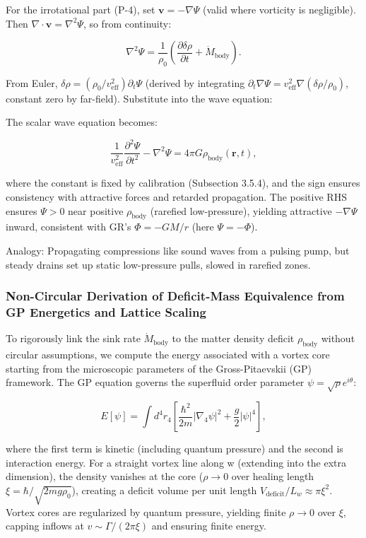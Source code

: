 \documentclass{article}
\begin{document}
For the irrotational part (P-4), set $\mathbf{v} = -\nabla \Psi$ (valid where vorticity is negligible). Then $\nabla \cdot \mathbf{v} = \nabla^2 \Psi$, so from continuity:

\[
\nabla^2 \Psi = \frac{1}{\rho_0} \left( \frac{\partial \delta \rho}{\partial t} + \dot{M}_{\text{body}} \right).
\]

From Euler, $\delta \rho = (\rho_0 / v_{\text{eff}}^2) \partial_t \Psi$ (derived by integrating $\partial_t \nabla \Psi = v_{\text{eff}}^2 \nabla (\delta \rho / \rho_0)$, constant zero by far-field). Substitute into the wave equation:

The scalar wave equation becomes:

\[
\frac{1}{v_{\text{eff}}^2} \frac{\partial^2 \Psi}{\partial t^2} - \nabla^2 \Psi = 4\pi G \rho_{\text{body}}(\mathbf{r}, t),
\]

where the constant is fixed by calibration (Subsection 3.5.4), and the sign ensures consistency with attractive forces and retarded propagation. The positive RHS ensures $\Psi > 0$ near positive $\rho_{\text{body}}$ (rarefied low-pressure), yielding attractive $-\nabla \Psi$ inward, consistent with GR's $\Phi = -GM/r$ (here $\Psi = -\Phi$).

Analogy: Propagating compressions like sound waves from a pulsing pump, but steady drains set up static low-pressure pulls, slowed in rarefied zones.

\subsubsection{Non-Circular Derivation of Deficit-Mass Equivalence from GP Energetics and Lattice Scaling}

To rigorously link the sink rate $\dot{M}_{\text{body}}$ to the matter density deficit $\rho_{\text{body}}$ without circular assumptions, we compute the energy associated with a vortex core starting from the microscopic parameters of the Gross-Pitaevskii (GP) framework. The GP equation governs the superfluid order parameter $\psi = \sqrt{\rho} e^{i \theta}$:

\[
E[\psi] = \int d^4 r_4 \left[ \frac{\hbar^2}{2 m} |\nabla_4 \psi|^2 + \frac{g}{2} |\psi|^4 \right],
\]

where the first term is kinetic (including quantum pressure) and the second is interaction energy. For a straight vortex line along w (extending into the extra dimension), the density vanishes at the core ($\rho \to 0$ over healing length $\xi = \hbar / \sqrt{2 m g \rho_0}$), creating a deficit volume per unit length $V_{\text{deficit}} / L_w \approx \pi \xi^2$. Vortex cores are regularized by quantum pressure, yielding finite $\rho \to 0$ over $\xi$, capping inflows at $v \sim \Gamma / (2\pi \xi)$ and ensuring finite energy.
\end{document}

